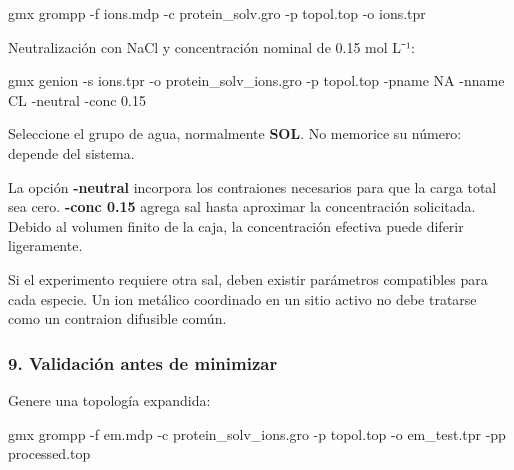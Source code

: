 \documentclass[
  spanish,
  11pt,
  a4paper]{article}
\newenvironment{Shaded}{\begin{snugshade}}{\end{snugshade}}
\newcommand{\AttributeTok}[1]{\textcolor[rgb]{0.13,0.29,0.53}{#1}}
\newcommand{\ExtensionTok}[1]{#1}
\newcommand{\NormalTok}[1]{#1}
\begin{document}
\begin{Shaded}
\begin{Highlighting}[]
\ExtensionTok{gmx}\NormalTok{ grompp     }\AttributeTok{{-}f}\NormalTok{ ions.mdp     }\AttributeTok{{-}c}\NormalTok{ protein\_solv.gro     }\AttributeTok{{-}p}\NormalTok{ topol.top     }\AttributeTok{{-}o}\NormalTok{ ions.tpr}
\end{Highlighting}
\end{Shaded}

Neutralización con NaCl y concentración nominal de 0.15 mol L⁻¹:

\begin{Shaded}
\begin{Highlighting}[]
\ExtensionTok{gmx}\NormalTok{ genion     }\AttributeTok{{-}s}\NormalTok{ ions.tpr     }\AttributeTok{{-}o}\NormalTok{ protein\_solv\_ions.gro     }\AttributeTok{{-}p}\NormalTok{ topol.top     }\AttributeTok{{-}pname}\NormalTok{ NA     }\AttributeTok{{-}nname}\NormalTok{ CL     }\AttributeTok{{-}neutral}     \AttributeTok{{-}conc}\NormalTok{ 0.15}
\end{Highlighting}
\end{Shaded}

Seleccione el grupo de agua, normalmente \textbf{SOL}. No memorice su
número: depende del sistema.

La opción \textbf{-neutral} incorpora los contraiones necesarios para
que la carga total sea cero. \textbf{-conc 0.15} agrega sal hasta
aproximar la concentración solicitada. Debido al volumen finito de la
caja, la concentración efectiva puede diferir ligeramente.

Si el experimento requiere otra sal, deben existir parámetros
compatibles para cada especie. Un ion metálico coordinado en un sitio
activo no debe tratarse como un contraion difusible común.

\subsubsection{9. Validación antes de
minimizar}\label{validaciuxf3n-antes-de-minimizar}

Genere una topología expandida:

\begin{Shaded}
\begin{Highlighting}[]
\ExtensionTok{gmx}\NormalTok{ grompp     }\AttributeTok{{-}f}\NormalTok{ em.mdp     }\AttributeTok{{-}c}\NormalTok{ protein\_solv\_ions.gro     }\AttributeTok{{-}p}\NormalTok{ topol.top     }\AttributeTok{{-}o}\NormalTok{ em\_test.tpr     }\AttributeTok{{-}pp}\NormalTok{ processed.top}
\end{Highlighting}
\end{Shaded}
\end{document}
